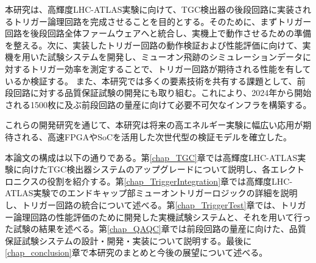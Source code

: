 本研究は、高輝度LHC-ATLAS実験に向けて、TGC検出器の後段回路に実装されるトリガー論理回路を完成させることを目的とする。そのために、まずトリガー回路を後段回路全体ファームウェアへと統合し、実機上で動作させるための準備を整える。次に、実装したトリガー回路の動作検証および性能評価に向けて、実機を用いた試験システムを開発し、ミューオン飛跡のシミュレーションデータに対するトリガー効率を測定することで、トリガー回路が期待される性能を有しているか検証する。
また、本研究では多くの要素技術を共有する課題として、前段回路に対する品質保証試験の開発にも取り組む。これにより、2024年から開始される1500枚に及ぶ前段回路の量産に向けて必要不可欠なインフラを構築する。

これらの開発研究を通じて、本研究は将来の高エネルギー実験に幅広い応用が期待される、高速FPGAやSoCを活用した次世代型の検証モデルを確立した。

本論文の構成は以下の通りである。第\ref{chap_TGC}章では高輝度LHC-ATLAS実験に向けたTGC検出器システムのアップグレードについて説明し、各エレクトロニクスの役割を紹介する。第\ref{chap_TriggerIntegration}章では高輝度LHC-ATLAS実験でのエンドキャップ部ミューオントリガーロジックの詳細を説明し、トリガー回路の統合について述べる。第\ref{chap_TriggerTest}章では、トリガー論理回路の性能評価のために開発した実機試験システムと、それを用いて行った試験の結果を述べる。第\ref{chap_QAQC}章では前段回路の量産に向けた、品質保証試験システムの設計・開発・実装について説明する。最後に\ref{chap_conclusion}章で本研究のまとめと今後の展望について述べる。